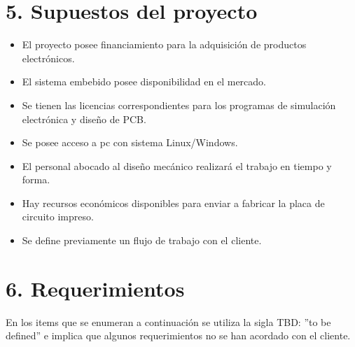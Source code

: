 \documentclass[
11pt, %
]{charter}
\begin{document}


\section{5. Supuestos del proyecto}
\label{sec:supuestos}
\begin{itemize}
	\item El proyecto posee financiamiento para la adquisición de productos electrónicos.   
	\item El sistema embebido posee disponibilidad en el mercado. 
	\item Se tienen las licencias correspondientes para los programas de simulación electrónica y diseño de PCB.  
	\item Se posee acceso a pc con sistema Linux/Windows. 
	\item El personal abocado al diseño mecánico realizará el trabajo en tiempo y forma.  
	\item Hay recursos económicos disponibles para enviar a fabricar la placa de circuito impreso. 
	\item Se define previamente un flujo de trabajo con el cliente. 
\end{itemize}

\section{6. Requerimientos}
\label{sec:requerimientos}
	En los items que se enumeran a continuación se utiliza la sigla TBD: ''to be defined'' e implica que algunos requerimientos no se han acordado con el cliente. 
\end{document}
